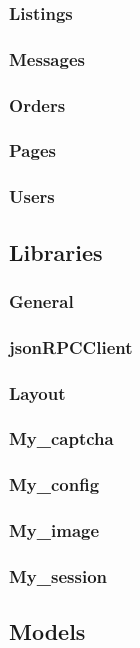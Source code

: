 \documentclass[11pt]{article} %
\begin{document}
\subsubsection{Listings}
\subsubsection{Messages}
\subsubsection{Orders}
\subsubsection{Pages}
\subsubsection{Users}


\subsection{Libraries}
\subsubsection{General}
\subsubsection{jsonRPCClient}
\subsubsection{Layout}
\subsubsection{My\_captcha}
\subsubsection{My\_config}
\subsubsection{My\_image}
\subsubsection{My\_session}


\subsection{Models}
\end{document}
